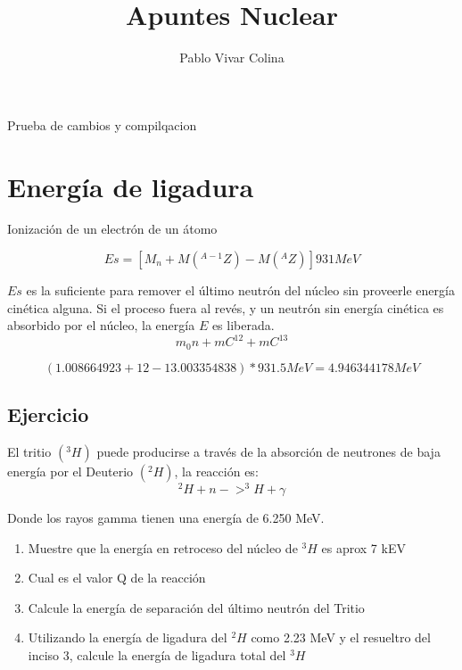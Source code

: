 \documentclass[]{article}
\title{Apuntes Nuclear}
\author{Pablo Vivar Colina}
\begin{document}
	

\maketitle



Prueba de cambios y compilqacion

\section{Energía de ligadura}

Ionización de un electrón de un átomo

\begin{equation}
  Es=[M_n+M(^{A-1}Z)-M(^AZ)]931MeV
\end{equation}

$Es$ es la suficiente para remover el último neutrón del núcleo sin proveerle energía cinética alguna. Si el proceso fuera al revés, y un neutrón sin energía cinética es absorbido por el núcleo, la energía $E$ es liberada.\\

\begin{equation}
  m_0 n+mC^{12}+mC^{13}
\end{equation}

\begin{equation}
  (1.008664923+12-13.003354838)*931.5MeV=4.946344178MeV
\end{equation}

\subsection{Ejercicio}

El tritio $(^3H)$ puede producirse a través de la absorción de neutrones de baja energía por el Deuterio $(^2H)$, la reacción es:\\

\begin{equation}
  ^2H+n->^3H+ \gamma
\end{equation}

Donde los rayos gamma tienen una energía de 6.250 MeV.\\

\begin{enumerate}
	\item Muestre que la energía en retroceso del núcleo de $^3H$ es aprox 7 kEV
	\item Cual es el valor Q de la reacción
	\item Calcule la energía de separación del último neutrón del Tritio
	\item Utilizando la energía de ligadura del $^2H$ como 2.23 MeV y el resueltro del inciso 3, calcule la energía de ligadura total del $^3H$ 
\end{enumerate}
\end{document}
